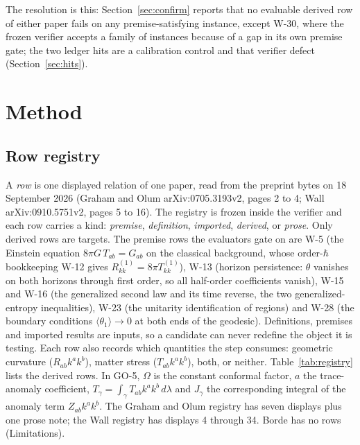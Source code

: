 \documentclass[11pt]{article}
\begin{document}
The resolution is this: Section~\ref{sec:confirm} reports that no evaluable derived row of either paper fails on any premise-satisfying instance, except W-30, where the frozen verifier accepts a family of instances because of a gap in its own premise gate; the two ledger hits are a calibration control and that verifier defect (Section~\ref{sec:hits}).

\section{Method}

\subsection{Row registry}
\label{sec:registry}

A \emph{row} is one displayed relation of one paper, read from the preprint bytes on 18 September 2026 (Graham and Olum arXiv:0705.3193v2, pages 2 to 4; Wall arXiv:0910.5751v2, pages 5 to 16). The registry is frozen inside the verifier and each row carries a kind: \emph{premise}, \emph{definition}, \emph{imported}, \emph{derived}, or \emph{prose}. Only derived rows are targets. The premise rows the evaluators gate on are W-5 (the Einstein equation $8\pi G\,T_{ab} = G_{ab}$ on the classical background, whose order-$\hbar$ bookkeeping W-12 gives $R^{(1)}_{kk} = 8\pi T^{(1)}_{kk}$), W-13 (horizon persistence: $\theta$ vanishes on both horizons through first order, so all half-order coefficients vanish), W-15 and W-16 (the generalized second law and its time reverse, the two generalized-entropy inequalities), W-23 (the unitarity identification of regions) and W-28 (the boundary conditions $\langle\theta_1\rangle \to 0$ at both ends of the geodesic). Definitions, premises and imported results are inputs, so a candidate can never redefine the object it is testing. Each row also records which quantities the step consumes: geometric curvature ($R_{ab}k^ak^b$), matter stress ($T_{ab}k^ak^b$), both, or neither. Table~\ref{tab:registry} lists the derived rows. In GO-5, $\Omega$ is the constant conformal factor, $a$ the trace-anomaly coefficient, $T_\gamma = \int_\gamma T_{ab}k^ak^b\,d\lambda$ and $J_\gamma$ the corresponding integral of the anomaly term $Z_{ab}k^ak^b$. The Graham and Olum registry has seven displays plus one prose note; the Wall registry has displays 4 through 34. Borde has no rows (Limitations).
\end{document}
